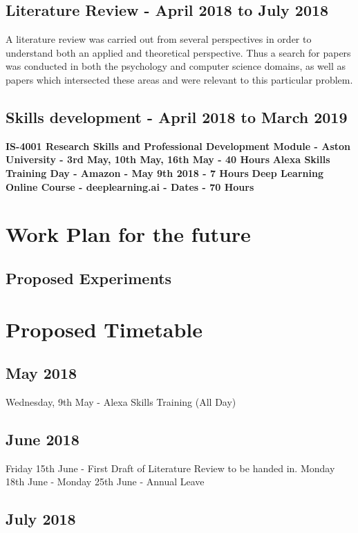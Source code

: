 \documentclass{article}
\begin{document}
	\subsection{Literature Review - April 2018 to July 2018}
	A literature review was carried out from several perspectives in order to understand both an applied and theoretical perspective. Thus a search for papers was conducted in both the psychology and computer science domains, as well as papers which intersected these areas and were relevant to this particular problem.
	
	\subsection{Skills development - April 2018 to March 2019}
	\textbf{IS-4001 Research Skills and Professional Development Module - Aston University - 3rd May, 10th May, 16th May - 40 Hours} 
	\newline
	\textbf{Alexa Skills Training Day - Amazon - May 9th 2018 - 7 Hours}
	\newline
	\textbf{Deep Learning Online Course - deeplearning.ai - Dates - 70 Hours}


	
	\section{Work Plan for the future}
	\subsection{Proposed Experiments}
	

	
	\section{Proposed Timetable}
	
	\subsection{May 2018}
	Wednesday, 9th May - Alexa Skills Training (All Day)
	\subsection{June 2018}
	Friday 15th June - First Draft of Literature Review to be handed in.
	\newline
	Monday 18th June - Monday 25th June - Annual Leave
	\subsection{July 2018}
	
\end{document}
